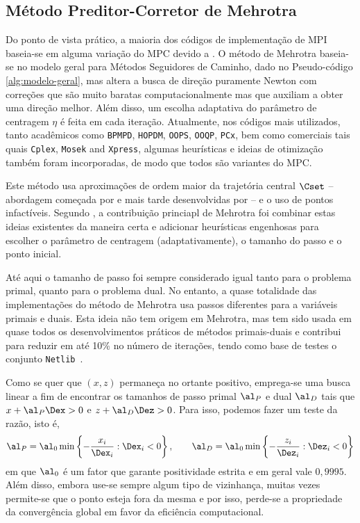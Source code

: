 \subsection{Método Preditor-Corretor de Mehrotra}
\label{sec:mehrotra-pc-method}
Do ponto de vista prático, a maioria dos códigos de implementação de \ac{MPI}
baseia-se em alguma variação do 
\ac{MPC} devido a \citet{Mehrotra:1992wr}. O método de Mehrotra baseia-se no modelo geral
para Métodos Seguidores de Caminho, dado no Pseudo-código
\ref{alg:modelo-geral}, mas altera a busca de direção puramente Newton com
correções que são muito baratas computacionalmente mas que auxiliam a obter uma
direção melhor. Além disso, um escolha adaptativa do parâmetro de centragem
$\eta$ é feita em cada iteração. Atualmente, nos códigos mais utilizados, tanto
acadêmicos como \texttt{BPMPD}, \texttt{HOPDM}, \texttt{OOPS}, \texttt{OOQP},
\texttt{PCx}, bem como  comerciais tais quais \texttt{Cplex}, \texttt{Mosek} and
\texttt{Xpress}, algumas heurísticas e ideias de otimização também foram
incorporadas, de modo que todos são variantes do \ac{MPC}.

Este método usa  aproximações de ordem maior da trajetória central $\Cset$ --
abordagem começada  por \citet{Meggido:Pathways-to-the-optimal:1988u} e mais
tarde desenvolvidas por
\citet{Monteiro:1990vn} -- e o uso de pontos infactíveis. Segundo \citet[pg
194]{Wright:Primal-dual-interior-point:1997h},  a contribuição princiapl
de Mehrotra foi combinar estas ideias existentes da maneira certa e adicionar
heurísticas engenhosas para escolher o parâmetro de centragem (adaptativamente), o tamanho
do passo e o ponto inicial.

Até aqui o tamanho de passo foi sempre considerado igual tanto para o problema
primal, quanto para o problema dual. No entanto, a quase totalidade das
implementações do método de Mehrotra usa passos diferentes para a variáveis
primais e duais. Esta ideia não tem origem em Mehrotra, mas tem sido usada em
quase todos os desenvolvimentos práticos de métodos primais-duais e  contribui
para reduzir em até 10\% no número de iterações, tendo como base de testes o
conjunto  \texttt{Netlib}~\cite[pg.
195]{Wright:Primal-dual-interior-point:1997h}.

Como se quer que $(x,z)$ permaneça no ortante positivo, emprega-se uma busca
linear a fim de encontrar os tamanhos de passo primal $\al_P$ e dual $\al_D$  tais que
$x+\al_P\Dex >0$ e $z+\al_D\Dez >0$. Para isso, podemos fazer um teste da
razão, isto é,
\begin{equation}
\label{eq:size-step}
\al_P = \al_0\min \left\{- \frac{x_i}{\Dex_i} : \Dex_i <
0\right\}, \qquad \al_D = \al_0\min \left\{- \frac{z_i}{\Dez_i} : \Dez_i <
0\right\}
\end{equation} 
em que $\al_0$ é um fator que garante positividade estrita e em geral vale
$0,9995$. Além disso, embora use-se sempre  algum tipo de vizinhança, muitas
vezes permite-se que o ponto esteja fora da mesma e por isso, perde-se a
propriedade da convergência global em favor da eficiência computacional. 


